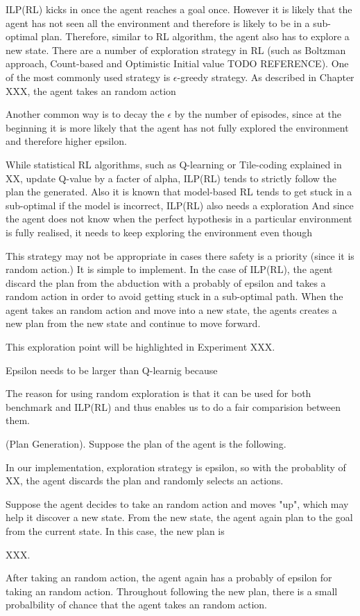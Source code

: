ILP(RL) kicks in once the agent reaches a goal once. However it is likely that the agent has not seen all the environment
and therefore is likely to be in a sub-optimal plan. Therefore, similar to RL algorithm, the agent also has to explore a new state.
There are a number of exploration strategy in RL (such as Boltzman approach, Count-based and Optimistic Initial value TODO REFERENCE).
One of the most commonly used strategy is $\epsilon$-greedy strategy. As described in Chapter XXX, the agent takes an random action

Another common way is to decay the $\epsilon$ by the number of episodes, since at the beginning it is more likely that the agent has not fully explored the environment and therefore higher epsilon.



While statistical RL algorithms, such as Q-learning or Tile-coding explained in XX, update Q-value by a facter of alpha, 
ILP(RL) tends to strictly follow the plan the generated. Also it is known that model-based RL tends to get stuck in a sub-optimal if the model is incorrect, ILP(RL) also needs a exploration
And since the agent does not know when the perfect hypothesis in a particular environment is fully realised, it needs to keep exploring the environment even though



This strategy may not be appropriate in cases there safety is a priority (since it is random action.)
It is simple to implement.
In the case of ILP(RL), the agent discard the plan from the abduction with a probably of epsilon and takes a random action in order to avoid getting stuck in a sub-optimal path.
When the agent takes an random action and move into a new state, the agents creates a new plan from the new state and continue to move forward.



This exploration point will be highlighted in Experiment XXX.

Epsilon needs to be larger than Q-learnig because

The reason for using random exploration is that it can be used for both benchmark and ILP(RL) and thus enables us to do a fair comparision between them.

\begin{examp} \normalfont (Plan Generation).
Suppose the plan of the agent is the following. 

In our implementation, exploration strategy is epsilon, so with the probablity of XX, the agent discards the plan and randomly selects an actions. 

Suppose the agent decides to take an random action and moves "up", which may help it discover a new state. 
From the new state, the agent again plan to the goal from the current state. In this case, the new plan is 

XXX. 

After taking an random action, the agent again has a probably of epsilon for taking an random action. 
Throughout following the new plan, there is a small probalbility of chance that the agent takes an random action.

\end{examp}
    
